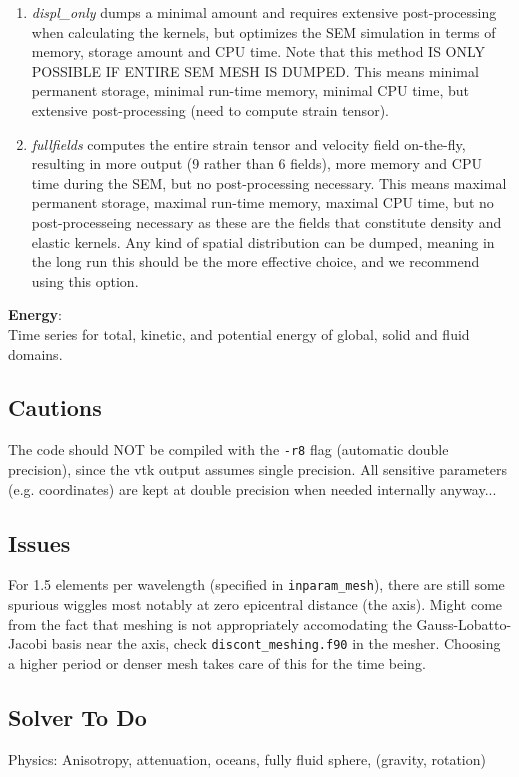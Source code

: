 \documentclass[11pt,letter,fleqn,english,notitlepage]{article}
\begin{document}
\begin{enumerate}
\item \textit{displ\_only} dumps a minimal amount and requires extensive 
 post-processing when calculating the kernels, but optimizes the SEM 
 simulation in terms of memory, storage amount and CPU time.
Note that this method IS ONLY POSSIBLE IF ENTIRE SEM MESH IS DUMPED.
This means minimal permanent storage, minimal run-time memory, minimal CPU time, 
but extensive post-processing (need to compute strain tensor).

\item \textit{fullfields} computes the entire strain tensor and velocity 
 field on-the-fly, resulting in more output (9 rather than 6 fields), 
 more memory and CPU time during the SEM, but no post-processing necessary. 
This means maximal permanent storage, maximal run-time memory, maximal CPU time, 
but no post-processeing necessary as these are the fields that 
constitute density and elastic kernels.
Any kind of spatial distribution can be dumped, meaning in the long run 
this should be the more effective choice, and we recommend using this option.
\end{enumerate}

\noindent \textbf{Energy}: \\
Time series for total, kinetic, and potential energy of global,
solid and fluid domains.

\subsection{Cautions}
The code should NOT be compiled with the {\tt -r8} flag (automatic double precision), since the vtk output 
assumes single precision. All sensitive parameters (e.g. coordinates) are kept at double precision when needed internally anyway...

\subsection{Issues}
For 1.5 elements per wavelength (specified in {\tt inparam\_mesh}), there are still some spurious wiggles 
most notably at zero epicentral distance (the axis). Might come from the fact that meshing is not appropriately accomodating 
the Gauss-Lobatto-Jacobi basis near the axis, check {\tt discont\_meshing.f90} in the mesher. 
Choosing a higher period or denser mesh takes care of this for the time being.

\subsection{Solver To Do}
\noindent Physics: Anisotropy, attenuation, oceans, fully fluid sphere, (gravity, rotation)\\
\end{document}
